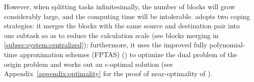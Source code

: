 However, when splitting tasks infinitesimally, the number of blocks will grow considerably large, and the computing time will be intolerable. \name adopts two coping strategies: it merges the blocks with the same source and destination pair into one subtask so as to reduce the calculation scale (see blocks merging in \Section\ref{subsec:system:centralized}); furthermore, it uses the improved fully polynomial-time approximation schemes (FPTAS) (\cite{fleischer2000approximating}) to optimize the dual problem of the origin problem and works out an $\epsilon$-optimal solution (see Appendix~\Section\ref{appendix:optimality} for the proof of near-optimality of \name).%
